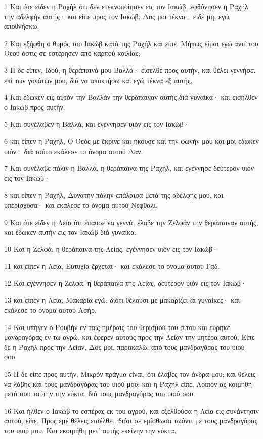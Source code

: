\par 1 Και ότε είδεν η Ραχήλ ότι δεν ετεκνοποίησεν εις τον Ιακώβ, εφθόνησεν η Ραχήλ την αδελφήν αυτής· και είπε προς τον Ιακώβ, Δος μοι τέκνα· ειδέ μη, εγώ αποθνήσκω.
\par 2 Και εξήφθη ο θυμός του Ιακώβ κατά της Ραχήλ και είπε, Μήπως είμαι εγώ αντί του Θεού όστις σε εστέρησεν από καρπού κοιλίας;
\par 3 Η δε είπεν, Ιδού, η θεράπαινά μου Βαλλά· είσελθε προς αυτήν, και θέλει γεννήσει επί των γονάτων μου, διά να αποκτήσω και εγώ τέκνα εξ αυτής.
\par 4 Και έδωκεν εις αυτόν την Βαλλάν την θεράπαιναν αυτής διά γυναίκα· και εισήλθεν ο Ιακώβ προς αυτήν.
\par 5 Και συνέλαβεν η Βαλλά, και εγέννησεν υιόν εις τον Ιακώβ·
\par 6 και είπεν η Ραχήλ, Ο Θεός με έκρινε και ήκουσε και την φωνήν μου και μοι έδωκεν υιόν· διά τούτο εκάλεσε το όνομα αυτού Δαν.
\par 7 Και συνέλαβε πάλιν η Βαλλά, η θεράπαινα της Ραχήλ, και εγέννησε δεύτερον υιόν εις τον Ιακώβ·
\par 8 και είπεν η Ραχήλ, Δυνατήν πάλην επάλαισα μετά της αδελφής μου, και υπερίσχυσα· και εκάλεσε το όνομα αυτού Νεφθαλί.
\par 9 Και ότε είδεν η Λεία ότι έπαυσε να γεννά, έλαβε την Ζελφάν την θεράπαιναν αυτής, και έδωκεν αυτήν εις τον Ιακώβ διά γυναίκα.
\par 10 Και η Ζελφά, η θεράπαινα της Λείας, εγέννησεν υιόν εις τον Ιακώβ·
\par 11 και είπεν η Λεία, Ευτυχία έρχεται· και εκάλεσε το όνομα αυτού Γαδ.
\par 12 Και εγέννησεν η Ζελφά, η θεράπαινα της Λείας, δεύτερον υιόν εις τον Ιακώβ·
\par 13 και είπεν η Λεία, Μακαρία εγώ, διότι θέλουσι με μακαρίζει αι γυναίκες· και εκάλεσε το όνομα αυτού Ασήρ.
\par 14 Και υπήγεν ο Ρουβήν εν ταις ημέραις του θερισμού του σίτου και εύρηκε μανδραγόρας εν τω αγρώ, και έφερεν αυτούς προς την Λείαν την μητέρα αυτού. Είπε δε η Ραχήλ προς την Λείαν, Δος μοι, παρακαλώ, από τους μανδραγόρας του υιού σου.
\par 15 Η δε είπε προς αυτήν, Μικρόν πράγμα είναι, ότι έλαβες τον άνδρα μου; και θέλεις να λάβης και τους μανδραγόρας του υιού μου; και η Ραχήλ είπε, Λοιπόν ας κοιμηθή μετά σου ταύτην την νύκτα, διά τους μανδραγόρας του υιού σου.
\par 16 Και ήλθεν ο Ιακώβ το εσπέρας εκ του αγρού, και εξελθούσα η Λεία εις συνάντησιν αυτού, είπε, Προς εμέ θέλεις εισέλθει, διότι σε εμίσθωσα τωόντι με τους μανδραγόρας του υιού μου. Και εκοιμήθη μετ' αυτής εκείνην την νύκτα.
